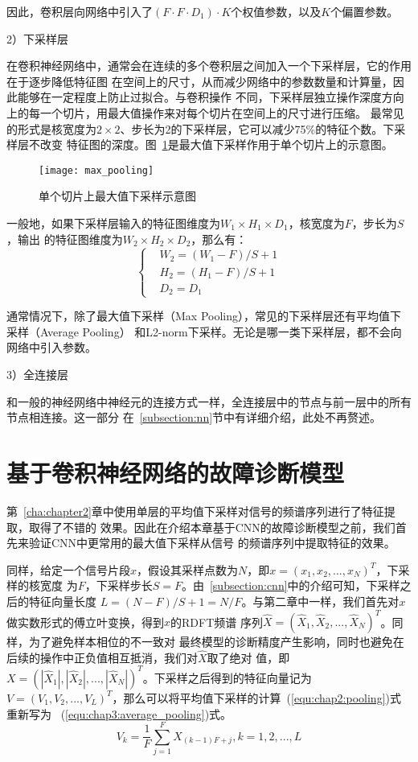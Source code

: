 因此，卷积层向网络中引入了$(F\cdot F\cdot D_1)\cdot K$个权值参数，以及$K$个偏置参数。

2）下采样层

在卷积神经网络中，通常会在连续的多个卷积层之间加入一个下采样层，它的作用在于逐步降低特征图
在空间上的尺寸，从而减少网络中的参数数量和计算量，因此能够在一定程度上防止过拟合。与卷积操作
不同，下采样层独立操作深度方向上的每一个切片，用最大值操作来对每个切片在空间上的尺寸进行压缩。
最常见的形式是核宽度为$2\times 2$、步长为2的下采样层，它可以减少75\%的特征个数。下采样层不改变
特征图的深度。图~\ref{fig:max_pooling}是最大值下采样作用于单个切片上的示意图。
\begin{figure}[ht]
  \centering%
  \texttt{[image: max\_pooling]}
  \caption{单个切片上最大值下采样示意图}
  \label{fig:max_pooling}
\end{figure}

一般地，如果下采样层输入的特征图维度为$W_1\times H_1\times D_1$，核宽度为$F$，步长为$S$，输出
的特征图维度为$W_2\times H_2\times D_2$，那么有：
\begin{equation}
  \label{equ:chap3:pool_dim}
  \left\{\begin{aligned}
    & W_2 = (W_1 - F)/S + 1 \\
    & H_2 = (H_1 - F)/S + 1 \\
    & D_2 = D_1
  \end{aligned}\right.
\end{equation}

通常情况下，除了最大值下采样（Max Pooling），常见的下采样层还有平均值下采样（Average Pooling）
和L2-norm下采样。无论是哪一类下采样层，都不会向网络中引入参数。

3）全连接层

和一般的神经网络中神经元的连接方式一样，全连接层中的节点与前一层中的所有节点相连接。这一部分
在~\ref{subsection:nn}节中有详细介绍，此处不再赘述。

\section{基于卷积神经网络的故障诊断模型}

第~\ref{cha:chapter2}章中使用单层的平均值下采样对信号的频谱序列进行了特征提取，取得了不错的
效果。因此在介绍本章基于CNN的故障诊断模型之前，我们首先来验证CNN中更常用的最大值下采样从信号
的频谱序列中提取特征的效果。

同样，给定一个信号片段$x$，假设其采样点数为$N$，即$x = (x_1,x_2,...,x_N)^T$，下采样的核宽度
为$F$，下采样步长$S=F$。由~\ref{subsection:cnn}中的介绍可知，下采样之后的特征向量长度
$L = (N-F)/S+1=N/F$。与第二章中一样，我们首先对$x$做实数形式的傅立叶变换，得到$x$的RDFT频谱
序列$\hat{X} = (\hat{X}_1, \hat{X}_2, ..., \hat{X}_N)^T$。同样，为了避免样本相位的不一致对
最终模型的诊断精度产生影响，同时也避免在后续的操作中正负值相互抵消，我们对$\hat{X}$取了绝对
值，即$X = (|\hat{X}_1|, |\hat{X}_2|, ..., |\hat{X}_N|)^T$。下采样之后得到的特征向量记为
$V = (V_1, V_2, ..., V_L)^T$，那么可以将平均值下采样的计算~(\ref{equ:chap2:pooling})式重新写为
~(\ref{equ:chap3:average_pooling})式。
\begin{equation}
  \label{equ:chap3:average_pooling}
  V_k = \frac{1}{F}\sum_{j=1}^{F}X_{(k-1)F+j}, k=1,2,...,L
\end{equation}

